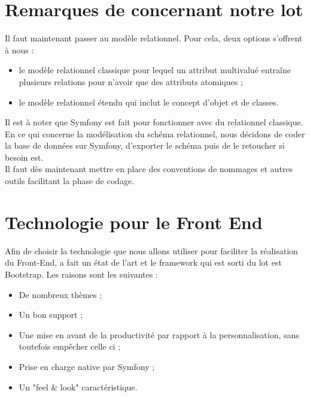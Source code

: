 \documentclass [a4paper] {article}
\begin{document}
\section{Remarques de \nomTuteurPedago{} concernant notre lot}
Il faut maintenant passer au modèle relationnel. Pour cela, deux options s'offrent à nous : 
\begin{itemize}
	\item le modèle relationnel classique pour lequel un attribut multivalué entraîne plusieurs relations pour n'avoir que des attributs atomiques ;
	\item le modèle relationnel étendu qui inclut le concept d'objet et de classes.
\end{itemize}
Il est à noter que Symfony est fait pour fonctionner avec du relationnel classique. \\
En ce qui concerne la modélisation du schéma relationnel, nous décidons de coder la base de données sur Symfony, d'exporter le schéma puis de le retoucher si besoin est. \\
Il faut dès maintenant mettre en place des conventions de nommages et autres outils facilitant la phase de codage.


\section{Technologie pour le Front End}
Afin de choisir la technologie que nous allons utiliser pour faciliter la réalisation du Front-End, \Matthieu{} a fait un état de l'art et le framework qui est sorti du lot est Bootstrap. Les raisons sont les suivantes : 
\begin{itemize}
	\item De nombreux thèmes ;
	\item Un bon support ;
	\item Une mise en avant de la productivité par rapport à la personnalisation, sans toutefois empêcher celle ci ;
	\item Prise en charge native par Symfony  ;
	\item Un "feel \& look" caractéristique.
\end{itemize}
\end{document}
